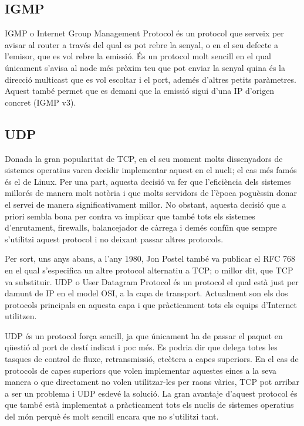 \newpage 
\subsection{IGMP}
{
    \ac{IGMP} o Internet Group Management Protocol és un protocol que serveix per avisar al router a través del qual es pot rebre la senyal,
    o en el seu defecte a l'emisor, que es vol rebre la emissió. És un protocol molt sencill en el qual únicament s'avisa al node més pròxim teu que pot enviar
    la senyal quina és la direcció multicast que es vol escoltar i el port, ademés d'altres petits paràmetres. Aquest també permet que es demani que 
    la emissió sigui d'una IP d'origen concret (IGMP v3).
}

\subsection{UDP}
{
    Donada la gran popularitat de TCP, en el seu moment molts dissenyadors de sistemes operatius varen decidir implementar aquest en el nucli; el cas més
    famós és el de Linux. Per una part, aquesta decisió va fer que l'eficiència dels sistemes millorés de manera molt notòria i que molts servidors de 
    l'època poguèssin donar el servei de manera significativament millor. No obstant, aquesta decisió que a priori sembla bona per contra va implicar que també tots
    els sistemes d'enrutament, firewalls, balancejador de càrrega i demés confïin que sempre s'utilitzi aquest protocol i no deixant passar altres protocols.
    
    Per sort, uns anys abans, a l'any 1980, Jon Postel també va publicar el RFC 768 en el qual s'especifica un altre protocol alternatiu a TCP; o millor dit,
    que TCP va substituir. \ac{UDP} o User Datagram Protocol és un protocol el qual està just per damunt de IP en el model \ac{OSI}, a la capa de
    transport. Actualment son els dos protocols principals en aquesta capa i que pràcticament tots els equips d'Internet utilitzen.

    UDP és un protocol força sencill, ja que únicament ha de passar el paquet en qüestió al port de destí indicat i poc més. Es podria dir que delega totes les
    tasques de control de fluxe, retransmissió, etcètera a capes superiors. En el cas de protocols de capes superiors que volen implementar aquestes eines a la 
    seva manera o que directament no volen utilitzar-les per raons vàries, TCP pot arribar a ser un problema i UDP esdevé la solució. La gran avantaje d'aquest
    protocol és que també està implementat a pràcticament tots els nuclis de sistemes operatius del món perquè és molt sencill encara que no s'utilitzi tant.

}

